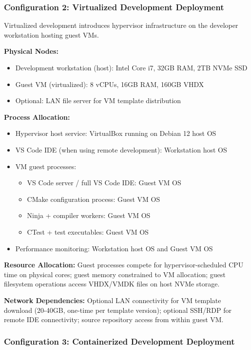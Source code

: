 \subsubsection{Configuration 2: Virtualized Development Deployment}

Virtualized development introduces hypervisor infrastructure on the developer workstation hosting guest VMs.

\textbf{Physical Nodes:}
\begin{itemize}
\item Development workstation (host): Intel Core i7, 32GB RAM, 2TB NVMe SSD
\item Guest VM (virtualized): 8 vCPUs, 16GB RAM, 160GB VHDX
\item Optional: LAN file server for VM template distribution
\end{itemize}

\textbf{Process Allocation:}
\begin{itemize}
\item Hypervisor host service: VirtualBox running on Debian 12 host OS
\item VS Code IDE (when using remote development): Workstation host OS
\item VM guest processes:
  \begin{itemize}
  \item VS Code server / full VS Code IDE: Guest VM OS
  \item CMake configuration process: Guest VM OS
  \item Ninja + compiler workers: Guest VM OS
  \item CTest + test executables: Guest VM OS
  \end{itemize}
\item Performance monitoring: Workstation host OS and Guest VM OS
\end{itemize}

\textbf{Resource Allocation:} Guest processes compete for hypervisor-scheduled CPU time on physical cores; guest memory constrained to VM allocation; guest filesystem operations access VHDX/VMDK files on host NVMe storage.

\textbf{Network Dependencies:} Optional LAN connectivity for VM template download (20-40GB, one-time per template version); optional SSH/RDP for remote IDE connectivity; source repository access from within guest VM.

\subsubsection{Configuration 3: Containerized Development Deployment}

